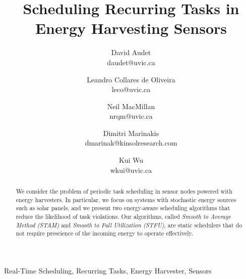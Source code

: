 \documentclass[10pt,conference]{IEEEtran}
\begin{document}
\title{Scheduling Recurring Tasks in Energy Harvesting Sensors}
\author{David Audet\\daudet@uvic.ca \and Leandro {Collares de Oliveira}\\leco@uvic.ca \and Neil MacMillan\\nrqm@uvic.ca \and Dimitri Marinakis\\dmarinak@kinsolresearch.com \and Kui Wu\\wkui@uvic.ca}

\maketitle


\begin{abstract}

We consider the problem of periodic task scheduling in sensor nodes powered with energy harvesters. In particular, we focus on systems with stochastic energy sources such as solar panels, and we present two energy-aware scheduling algorithms that reduce the likelihood of task violations. Our algorithms, called \emph{Smooth to Average Method (STAM)} and \emph{Smooth to Full Utilization (STFU)}, are static schedulers that do not require prescience of the incoming energy to operate effectively.
\end{abstract}

\begin{IEEEkeywords} Real-Time Scheduling, Recurring Tasks, Energy Harvester, Sensors
\end{IEEEkeywords}

























\end{document}
